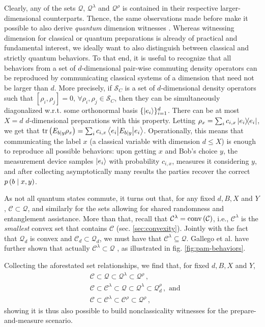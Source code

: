             Clearly, any of the sets $\mathcal{Q}$, $\mathcal{Q}^\lambda$ and $\mathcal{Q}^\rho$ is contained in their respective larger-dimensional counterparts. Thence, the same observations made before make it possible to also derive \emph{quantum} dimension witnesses \cite{gallego_pam_2010}. Whereas witnessing dimension for classical or quantum preparations is already of practical and fundamental interest, we ideally want to also distinguish between classical and strictly quantum behaviors. To that end, it is useful to recognize that all behaviors from a set of $d$-dimensional pair-wise commuting density operators can be reproduced by communicating classical systems of a dimension that need not be larger than $d$. More precisely, if $\mathcal{S}_C$ is a set of $d$-dimensional density operators such that $\left[ \rho_i, \rho_j \right] = 0, \,\forall \rho_i, \rho_j \in \mathcal{S}_C$, then they can be simultaneously diagonalized w.r.t. some orthonormal basis $\{ \ket{ e_i } \}_{i=1}^d$. There can be at most $X=d$ $d$-dimensional preparations with this property. Letting $\rho_x = \sum_i c_{i,x} \ketbra{e_i}{e_i}$, we get that $\text{tr}\left(  E_{b \mid y} \rho_x  \right) = \sum_i c_{i,x} \left\langle e_i \middle\vert E_{b \mid y} \middle\vert e_i \right\rangle$. Operationally, this means that communicating the label $x$ (a classical variable with dimension $d \leq X$) is enough to reproduce all possible behaviors: upon getting $x$ and Bob's choice $y$, the measurement device samples $\ket{e_i}$ with probability $c_{i,x}$, measures it considering $y$, and after collecting asymptotically many results the parties recover the correct $p \left( b \mid x,y \right)$.  
            
            As not all quantum states commute, it turns out that, for any fixed $d,B,X$ and $Y$, $\mathcal{C} \subset \mathcal{Q}$, and similarly for the sets allowing for shared randomness and entanglement assistance.  More than that, recall that $\mathcal{C}^\lambda = \text{conv} \left( \mathcal{C} \right)$, i.e., $\mathcal{C}^\lambda$ is the \emph{smallest} convex set that contains $\mathcal{C}$ (sec. \ref{sec:convexity}). Jointly with the fact that $\mathcal{Q}_d$ is convex and $\mathcal{C}_d \subset \mathcal{Q}_d$, we must have that $\mathcal{C}^\lambda \subseteq \mathcal{Q}$. Gallego et al. have further shown that actually $\mathcal{C}^\lambda \subset \mathcal{Q}$ \cite{gallego_pam_2010}, as illustrated in fig. \ref{fig:pam-behaviors}.
			
			Collecting the aforestated set relationships, we find that, for fixed $d, B, X$ and $Y$, 
            \begin{align}
                &\mathcal{C} \subset \mathcal{Q} \subset \mathcal{Q}^\lambda \subset \mathcal{Q}^\rho\, , \\
                &\mathcal{C} \subset \mathcal{C}^\lambda \subset \mathcal{Q} \subset \mathcal{Q}^\lambda \subset \mathcal{Q}_d^\rho\, , \text{ and} \\
                &\mathcal{C} \subset \mathcal{C}^\lambda \subset \mathcal{C}^\rho \subset \mathcal{Q}^\rho\, ,
            \end{align}
            showing it is thus also possible to build nonclassicality witnesses for the prepare-and-measure scenario.

